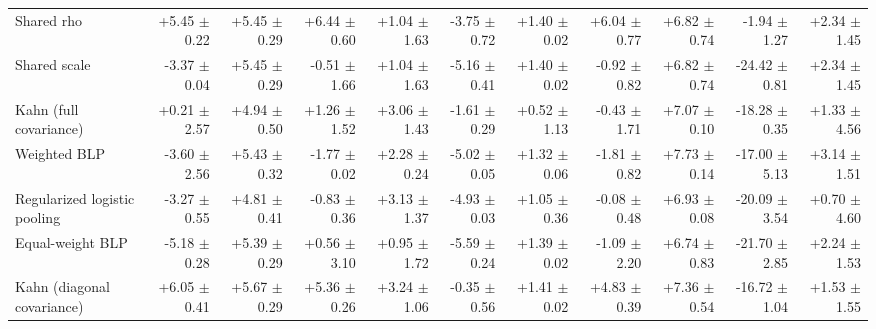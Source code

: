 \begin{tabular}{lrrrrrrrrrr}
Shared rho & +5.45 {\scriptsize $\pm$ 0.22} & +5.45 {\scriptsize $\pm$ 0.29} & +6.44 {\scriptsize $\pm$ 0.60} & +1.04 {\scriptsize $\pm$ 1.63} & -3.75 {\scriptsize $\pm$ 0.72} & +1.40 {\scriptsize $\pm$ 0.02} & +6.04 {\scriptsize $\pm$ 0.77} & +6.82 {\scriptsize $\pm$ 0.74} & -1.94 {\scriptsize $\pm$ 1.27} & +2.34 {\scriptsize $\pm$ 1.45} \\
Shared scale & -3.37 {\scriptsize $\pm$ 0.04} & +5.45 {\scriptsize $\pm$ 0.29} & -0.51 {\scriptsize $\pm$ 1.66} & +1.04 {\scriptsize $\pm$ 1.63} & -5.16 {\scriptsize $\pm$ 0.41} & +1.40 {\scriptsize $\pm$ 0.02} & -0.92 {\scriptsize $\pm$ 0.82} & +6.82 {\scriptsize $\pm$ 0.74} & -24.42 {\scriptsize $\pm$ 0.81} & +2.34 {\scriptsize $\pm$ 1.45} \\
Kahn (full covariance) & +0.21 {\scriptsize $\pm$ 2.57} & +4.94 {\scriptsize $\pm$ 0.50} & +1.26 {\scriptsize $\pm$ 1.52} & +3.06 {\scriptsize $\pm$ 1.43} & -1.61 {\scriptsize $\pm$ 0.29} & +0.52 {\scriptsize $\pm$ 1.13} & -0.43 {\scriptsize $\pm$ 1.71} & +7.07 {\scriptsize $\pm$ 0.10} & -18.28 {\scriptsize $\pm$ 0.35} & +1.33 {\scriptsize $\pm$ 4.56} \\
Weighted BLP & -3.60 {\scriptsize $\pm$ 2.56} & +5.43 {\scriptsize $\pm$ 0.32} & -1.77 {\scriptsize $\pm$ 0.02} & +2.28 {\scriptsize $\pm$ 0.24} & -5.02 {\scriptsize $\pm$ 0.05} & +1.32 {\scriptsize $\pm$ 0.06} & -1.81 {\scriptsize $\pm$ 0.82} & +7.73 {\scriptsize $\pm$ 0.14} & -17.00 {\scriptsize $\pm$ 5.13} & +3.14 {\scriptsize $\pm$ 1.51} \\
Regularized logistic pooling & -3.27 {\scriptsize $\pm$ 0.55} & +4.81 {\scriptsize $\pm$ 0.41} & -0.83 {\scriptsize $\pm$ 0.36} & +3.13 {\scriptsize $\pm$ 1.37} & -4.93 {\scriptsize $\pm$ 0.03} & +1.05 {\scriptsize $\pm$ 0.36} & -0.08 {\scriptsize $\pm$ 0.48} & +6.93 {\scriptsize $\pm$ 0.08} & -20.09 {\scriptsize $\pm$ 3.54} & +0.70 {\scriptsize $\pm$ 4.60} \\
Equal-weight BLP & -5.18 {\scriptsize $\pm$ 0.28} & +5.39 {\scriptsize $\pm$ 0.29} & +0.56 {\scriptsize $\pm$ 3.10} & +0.95 {\scriptsize $\pm$ 1.72} & -5.59 {\scriptsize $\pm$ 0.24} & +1.39 {\scriptsize $\pm$ 0.02} & -1.09 {\scriptsize $\pm$ 2.20} & +6.74 {\scriptsize $\pm$ 0.83} & -21.70 {\scriptsize $\pm$ 2.85} & +2.24 {\scriptsize $\pm$ 1.53} \\
Kahn (diagonal covariance) & +6.05 {\scriptsize $\pm$ 0.41} & +5.67 {\scriptsize $\pm$ 0.29} & +5.36 {\scriptsize $\pm$ 0.26} & +3.24 {\scriptsize $\pm$ 1.06} & -0.35 {\scriptsize $\pm$ 0.56} & +1.41 {\scriptsize $\pm$ 0.02} & +4.83 {\scriptsize $\pm$ 0.39} & +7.36 {\scriptsize $\pm$ 0.54} & -16.72 {\scriptsize $\pm$ 1.04} & +1.53 {\scriptsize $\pm$ 1.55} \\

\end{tabular}
